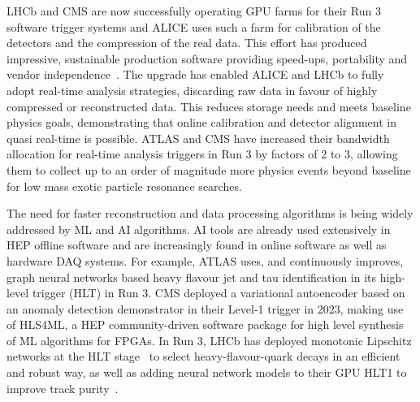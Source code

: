 \documentclass[10pt,a4paper]{article}
\begin{document}
LHCb\cite{LHCb:RTDP} and CMS\cite{CMS:Detector_R3}
are now successfully operating GPU farms for their
Run 3 software trigger systems and ALICE\cite{ALICE:LS2_upgrades} uses such a farm for
calibration of the detectors and the compression of the real data. This
effort has produced impressive, sustainable production software providing
speed-ups, portability and vendor
independence~\cite{Concas:2024cyu, Aaij2020Allen,MathesP3MA2017}. The
upgrade has enabled ALICE and LHCb to fully adopt real-time analysis strategies,
discarding raw data in favour of highly compressed or reconstructed
data. This reduces storage needs and meets baseline physics goals, demonstrating that
online calibration and detector alignment in quasi real-time is possible.
ATLAS\cite{ATLAS:trigger_LS3} and CMS\cite{CMS:enriching_phys_programs}
have increased their bandwidth allocation for real-time
analysis triggers in Run 3 by factors of 2 to 3, allowing them to
collect up to an order of magnitude more physics events beyond
baseline for low mass exotic particle resonance searches.

The need for faster reconstruction and data processing algorithms is being
widely addressed by ML and AI algorithms. AI tools are already used extensively
in HEP offline software and are increasingly found in online software as well as
hardware DAQ systems. For example, ATLAS uses, and continuously improves, graph
neural networks based heavy flavour jet and tau identification in its high-level
trigger (HLT)\cite{ATLAS:perf_commissioning} in Run 3.
CMS deployed a variational autoencoder based on
an anomaly detection demonstrator in their Level-1 trigger in 2023\cite{CMS-DP-2023-079},
making use of HLS4ML\cite{fastml_team_hls4ml}, a HEP community-driven
software package for high level synthesis of ML algorithms for FPGAs. In Run 3,
LHCb has deployed monotonic Lipschitz networks at the HLT
stage~\cite{LHCb:Lipschitz} to select heavy-flavour-quark decays in an efficient
and robust way, as well as adding neural network models to their GPU HLT1 to
improve track purity~\cite{neuralmodelHLT1LHCb}.
\end{document}
